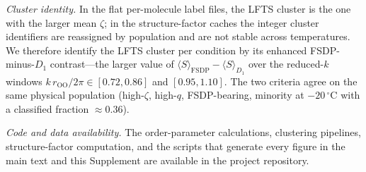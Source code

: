 \documentclass[aps,amsmath,amssymb,onecolumn,superscriptaddress,nofootinbib]{revtex4-2}
\begin{document}
\emph{Cluster identity.}
In the flat per-molecule label files, the LFTS cluster is the one with the
larger mean $\zeta$; in the structure-factor caches the integer cluster
identifiers are reassigned by population and are not stable across temperatures.
We therefore identify the LFTS cluster per condition by its enhanced
FSDP-minus-$D_1$ contrast---the larger value of
$\langle S\rangle_{\mathrm{FSDP}} - \langle S\rangle_{D_1}$ over the reduced-$k$
windows $k\,r_{\mathrm{OO}}/2\pi\in[0.72,0.86]$ and $[0.95,1.10]$. The two
criteria agree on the same physical population (high-$\zeta$, high-$q$,
FSDP-bearing, minority at $-20\,^{\circ}$C with a classified fraction
$\approx 0.36$).

\emph{Code and data availability.}
The order-parameter calculations, clustering pipelines, structure-factor
computation, and the scripts that generate every figure in the main text and
this Supplement are available in the project repository.

\FloatBarrier
\end{document}
